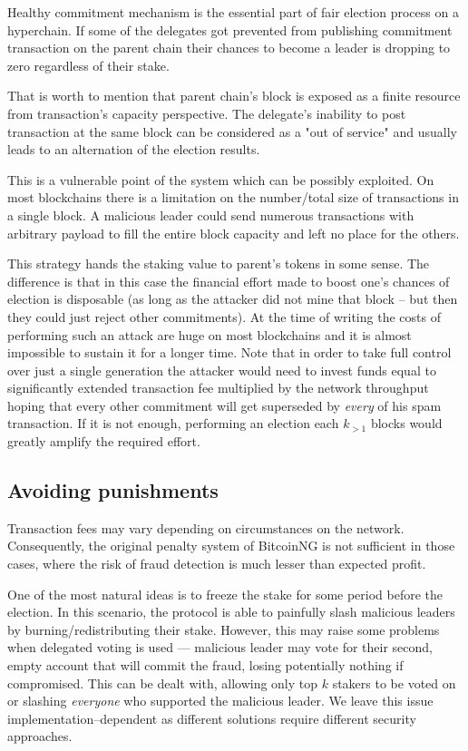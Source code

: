 Healthy commitment mechanism is the essential part of fair election process on a hyperchain. If
some of the delegates got prevented from publishing commitment transaction on
the parent chain their chances to become a leader is dropping to zero regardless of
their stake. 

That is worth to mention that parent chain's block is exposed as a finite resource from transaction's capacity perspective\cite{bitcoin_scaling}. The delegate's inability to post transaction at the same block can be considered as a "out of service" and usually leads to an alternation of the election results.

This is a vulnerable point of the system which can be possibly
exploited. On most blockchains there is a limitation on the number/total size
of transactions in a single block\cite{avg_txs_per_block}. A malicious leader could send numerous
transactions with arbitrary payload to fill the entire block capacity and left no place for the others.

This strategy hands the staking value to parent's tokens in some sense. The
difference is that in this case the financial effort made to boost one's chances
of election is disposable (as long as the attacker did not mine that block – but
then they could just reject other commitments). At the time of writing the costs
of performing such an attack are huge on most blockchains and it is
almost impossible to sustain it for a longer time. Note that in order to take
full control over just a single generation the
attacker would need to invest funds equal to significantly extended transaction
fee multiplied by the network throughput hoping that every other commitment will
get superseded by \textit{every} of his spam transaction. If it is not enough,
performing an election each $k_{> 1}$ blocks would greatly amplify the required
effort.

\subsection{Avoiding punishments}
Transaction fees may vary depending on circumstances on the network.
Consequently, the original penalty system of BitcoinNG is not sufficient in
those cases, where the risk of fraud detection is much lesser than expected profit.

One of the most natural ideas is to freeze the stake for some period before the
election. In this scenario, the protocol is able to painfully slash
malicious leaders by burning/redistributing their stake. However, this may raise
some problems when delegated voting is used — malicious leader may vote
for their second, empty account that will commit the fraud, losing potentially
nothing if compromised. This can be dealt with, allowing only
top $k$ stakers to be voted on or slashing \textit{everyone} who supported the
malicious leader. We leave this issue implementation–dependent as different solutions
require different security approaches.
